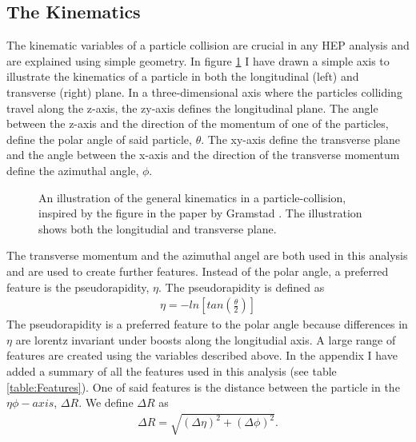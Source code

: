 \subsection{The Kinematics}
The kinematic variables of a particle collision are crucial in any \ac{HEP} analysis and are explained using simple 
geometry. In figure \ref{fig:Kinematics} I have drawn a simple axis to illustrate the kinematics of a particle in both the 
longitudinal (left) and transverse (right) plane. In a three-dimensional axis where the particles colliding travel along the 
z-axis, the zy-axis defines the longitudinal plane.  The angle between the z-axis and the direction of the momentum of
one of the particles, define the polar angle of said particle, $\theta$. The xy-axis define the transverse plane and the 
angle between the x-axis and the direction of the transverse momentum define the azimuthal angle, $\phi$.
\begin{figure}
    \centering
    \caption[An illustration of the general kinematics in a particle-collision.]{An illustration of the general kinematics in a particle-collision, inspired by the 
    figure in the paper by Gramstad \cite{gramstad_searches_nodate}. The illustration shows both the 
    longitudial and transverse plane. }
    \label{fig:Kinematics}
\end{figure}
The transverse momentum and the azimuthal angel are both used in this analysis and are used to create further features. 
Instead of the polar angle, a preferred feature is the pseudorapidity, $\eta$. The pseudorapidity is defined as 
\begin{align}\label{eq:eta}
    \eta = -ln\left[tan\left(\frac{\theta}{2}\right)\right]
\end{align}
The pseudorapidity is a preferred feature to the polar angle because differences in $\eta$ are lorentz invariant under boosts 
along the longitudial axis. A large range of features are created using the variables described above. In the appendix I have 
added a summary of all the features used in this analysis (see table \ref{table:Features}). One of said features is the distance 
between the particle in the $\eta\phi-axis$, $\Delta R$. We define $\Delta R$ as 
\begin{align}
    \Delta R = \sqrt{(\Delta \eta)^2 + (\Delta \phi)^2}.
\end{align}
